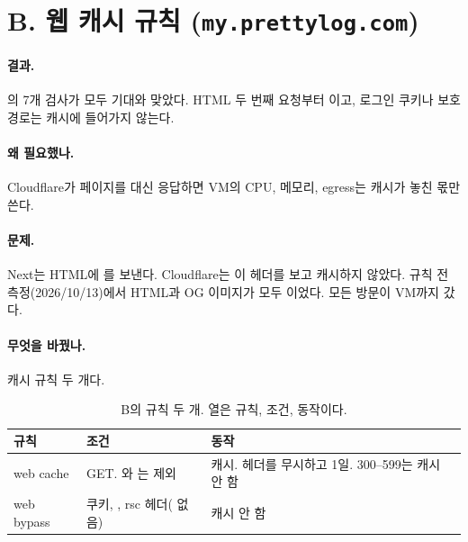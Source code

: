 \section{B. 웹 캐시 규칙 (\texttt{my.prettylog.com})}\label{sec:rt-b}

\paragraph{결과.}
의 7개 검사가 모두 기대와 맞았다.
HTML 두 번째 요청부터 이고, 로그인 쿠키나 보호 경로는 캐시에 들어가지 않는다.

\paragraph{왜 필요했나.}
Cloudflare가 페이지를 대신 응답하면 VM의 CPU, 메모리, egress는 캐시가 놓친 몫만 쓴다.

\paragraph{문제.}
Next는 HTML에 를 보낸다.
Cloudflare는 이 헤더를 보고 캐시하지 않았다.
규칙 전 측정(2026/10/13)에서 HTML과 OG 이미지가 모두 이었다.
모든 방문이 VM까지 갔다.

\paragraph{무엇을 바꿨나.}
캐시 규칙 두 개다.

\begin{table}[H]
  \caption{B의 규칙 두 개. 열은 규칙, 조건, 동작이다.}
  \label{tab:rt-b-rules}
  \centering\small
  \begin{tabularx}{\linewidth}{@{}L{2.3cm}L{5.8cm}Y@{}}
    \toprule
    규칙 & 조건 & 동작 \\
    \midrule
    web cache &  GET. 와 는 제외 & 캐시. 헤더를 무시하고 1일. 300--599는 캐시 안 함 \\
    \midrule
    web bypass &  쿠키,     , rsc 헤더( 없음) & 캐시 안 함 \\
    \bottomrule
  \end{tabularx}
\end{table}

